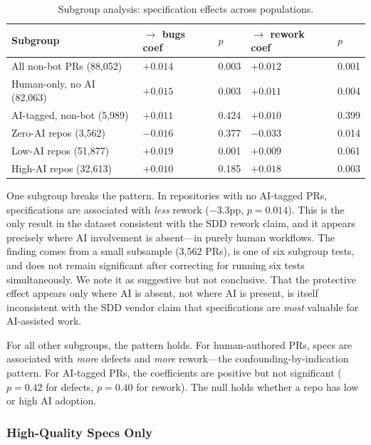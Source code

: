\documentclass[a4paper,UKenglish,cleveref,autoref,thm-restate]{lipics-v2021}
\begin{document}
\begin{table}[t]
\centering
\caption{Subgroup analysis: specification effects across populations.}
\label{tab:subgroup}
\begin{tabular}{@{}lllll@{}}
\toprule
\textbf{Subgroup} & \textbf{$\rightarrow$ bugs coef} & \textbf{$p$} & \textbf{$\rightarrow$ rework coef} & \textbf{$p$} \\
\midrule
All non-bot PRs (88,052) & $+0.014$ & 0.003 & $+0.012$ & 0.001 \\
Human-only, no AI (82,063) & $+0.015$ & 0.003 & $+0.011$ & 0.004 \\
AI-tagged, non-bot (5,989) & $+0.011$ & 0.424 & $+0.010$ & 0.399 \\
Zero-AI repos (3,562) & $-0.016$ & 0.377 & $-0.033$ & 0.014 \\
Low-AI repos (51,877) & $+0.019$ & 0.001 & $+0.009$ & 0.061 \\
High-AI repos (32,613) & $+0.010$ & 0.185 & $+0.018$ & 0.003 \\
\bottomrule
\end{tabular}
\end{table}

One subgroup breaks the pattern. In repositories with no AI-tagged PRs, specifications are associated with \emph{less} rework ($-3.3$pp, $p = 0.014$). This is the only result in the dataset consistent with the SDD rework claim, and it appears precisely where AI involvement is absent---in purely human workflows. The finding comes from a small subsample (3,562 PRs), is one of six subgroup tests, and does not remain significant after correcting for running six tests simultaneously. We note it as suggestive but not conclusive. That the protective effect appears only where AI is absent, not where AI is present, is itself inconsistent with the SDD vendor claim that specifications are \emph{most} valuable for AI-assisted work.

For all other subgroups, the pattern holds. For human-authored PRs, specs are associated with \emph{more} defects and \emph{more} rework---the confounding-by-indication pattern. For AI-tagged PRs, the coefficients are positive but not significant ($p = 0.42$ for defects, $p = 0.40$ for rework). The null holds whether a repo has low or high AI adoption.

\subsubsection{High-Quality Specs Only}
\end{document}
